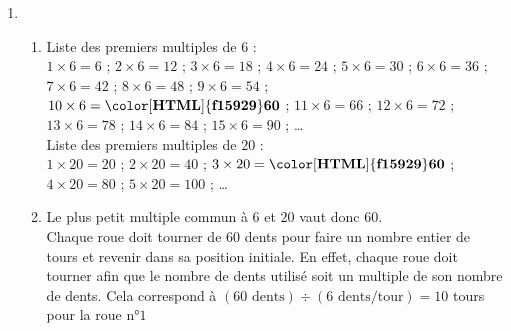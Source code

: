 \begin{corrige}
        \begin{enumerate}
            \item 
                \begin{enumerate}
                    \item Liste des premiers multiples de $6$ : \\
                    $1\times6 = 6$ ; $2\times6 = 12$ ; $3\times6 = 18$ ; $4\times6 = 24$ ; $5\times6 = 30$ ;
                    $6\times6 = 36$ ; $7\times6 = 42$ ; $8\times6 = 48$ ; $9\times6 = 54$ ; $10\times6 = \mathbf{{\color[HTML]{f15929}60}}$ ;
                    $11\times6 = 66$ ; $12\times6 = 72$ ; $13\times6 = 78$ ; $14\times6 = 84$ ; $15\times6 = 90$ ;
                    \dots \\
                    Liste des premiers multiples de $20$ : \\
                    $1\times20 = 20$ ; $2\times20 = 40$ ; $3\times20 = \mathbf{{\color[HTML]{f15929}60}}$ ; $4\times20 = 80$ ; $5\times20 = 100$ ;
                    \dots \\
                    \medskip
                    \item Le plus petit multiple commun à $6$ et $20$ vaut donc $60$.\\
                    Chaque roue doit tourner de $60$ dents pour faire un nombre entier de tours et revenir dans sa position initiale. 
                    En effet, chaque roue doit tourner afin que le nombre de dents utilisé soit un multiple de son nombre de dents.
                    Cela correspond à $(60\text{ dents})\div (6\text{ dents/tour}) = 10$ tours pour la roue n°$1$ 
                    

\end{enumerate}
\end{enumerate}
\end{corrige}
